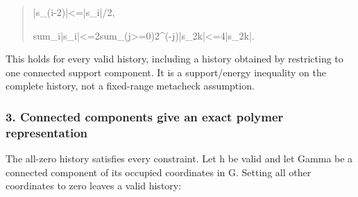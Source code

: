 \documentclass[
]{article}
\begin{document}
\begin{quote}\small\ttfamily\raggedright\setlength{\parskip}{0pt}
\noindent |\allowbreak{}s\allowbreak{}\_\allowbreak{}(\allowbreak{}i\allowbreak{}-\allowbreak{}2\allowbreak{})\allowbreak{}|\allowbreak{}\hspace*{0.525em}\allowbreak{}<\allowbreak{}=\allowbreak{}\hspace*{0.525em}\allowbreak{}|\allowbreak{}s\allowbreak{}\_\allowbreak{}i\allowbreak{}|\allowbreak{}/\allowbreak{}2\allowbreak{},\par
\noindent s\allowbreak{}u\allowbreak{}m\allowbreak{}\_\allowbreak{}i\allowbreak{}\hspace*{0.525em}\allowbreak{}|\allowbreak{}s\allowbreak{}\_\allowbreak{}i\allowbreak{}|\allowbreak{}\hspace*{0.525em}\allowbreak{}<\allowbreak{}=\allowbreak{}\hspace*{0.525em}\allowbreak{}2\allowbreak{}\hspace*{0.525em}\allowbreak{}s\allowbreak{}u\allowbreak{}m\allowbreak{}\_\allowbreak{}(\allowbreak{}j\allowbreak{}>\allowbreak{}=\allowbreak{}0\allowbreak{})\allowbreak{}\hspace*{0.525em}\allowbreak{}2\allowbreak{}\^{}\allowbreak{}(\allowbreak{}-\allowbreak{}j\allowbreak{})\allowbreak{}\hspace*{0.525em}\allowbreak{}|\allowbreak{}s\allowbreak{}\_\allowbreak{}2\allowbreak{}k\allowbreak{}|\allowbreak{}\hspace*{0.525em}\allowbreak{}<\allowbreak{}=\allowbreak{}\hspace*{0.525em}\allowbreak{}4\allowbreak{}\hspace*{0.525em}\allowbreak{}|\allowbreak{}s\allowbreak{}\_\allowbreak{}2\allowbreak{}k\allowbreak{}|\allowbreak{}.\par
\end{quote}

This holds for every valid history, including a history obtained by
restricting to one connected support component. It is a support/energy
inequality on the complete history, not a fixed-range metacheck
assumption.

\subsubsection{3. Connected components give an exact polymer
representation}\label{connected-components-give-an-exact-polymer-representation}

The all-zero history satisfies every constraint. Let h be valid and let
Gamma be a connected component of its occupied coordinates in G. Setting
all other coordinates to zero leaves a valid history:
\end{document}
